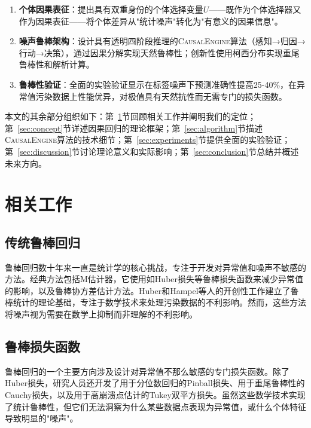 \documentclass[conference]{IEEEtran}
\newcommand{\causalengine}{\textsc{CausalEngine}}
\begin{document}
\begin{CJK}{UTF8}{gbsn}
\begin{enumerate}
\item \textbf{个体因果表征}：提出具有双重身份的个体选择变量$U$——既作为个体选择器又作为因果表征——将个体差异从"统计噪声"转化为"有意义的因果信息"。

\item \textbf{噪声鲁棒架构}：设计具有透明四阶段推理的\causalengine{}算法（感知→归因→行动→决策），通过因果分解实现天然鲁棒性；创新性使用柯西分布实现重尾鲁棒性和解析计算。

\item \textbf{鲁棒性验证}：全面的实验验证显示在标签噪声下预测准确性提高25-40\%，在异常值污染数据上性能优异，对极值具有天然抗性而无需专门的损失函数。
\end{enumerate}

本文的其余部分组织如下：第~\ref{sec:related}节回顾相关工作并阐明我们的定位；第~\ref{sec:concept}节详述因果回归的理论框架；第~\ref{sec:algorithm}节描述\causalengine{}算法的技术细节；第~\ref{sec:experiments}节提供全面的实验验证；第~\ref{sec:discussion}节讨论理论意义和实际影响；第~\ref{sec:conclusion}节总结并概述未来方向。

\section{相关工作}
\label{sec:related}

\subsection{传统鲁棒回归}
鲁棒回归数十年来一直是统计学的核心挑战，专注于开发对异常值和噪声不敏感的方法。经典方法包括M估计器\cite{huber1964robust}，它使用如Huber损失等鲁棒损失函数来减少异常值的影响，以及鲁棒协方差估计方法\cite{rousseeuw1987robust}。Huber\cite{huber2009robust}和Hampel等人\cite{hampel1986robust}的开创性工作建立了鲁棒统计的理论基础，专注于数学技术来处理污染数据的不利影响。然而，这些方法将噪声视为需要在数学上抑制而非理解的不利影响。

\subsection{鲁棒损失函数}
鲁棒回归的一个主要方向涉及设计对异常值不那么敏感的专门损失函数。除了Huber损失，研究人员还开发了用于分位数回归的Pinball损失\cite{koenker1978regression}、用于重尾鲁棒性的Cauchy损失，以及用于高崩溃点估计的Tukey双平方损失\cite{maronna2019robust}。虽然这些数学技术实现了统计鲁棒性，但它们无法洞察为什么某些数据点表现为异常值，或什么个体特征导致明显的"噪声"。


\end{CJK}
\end{document}
